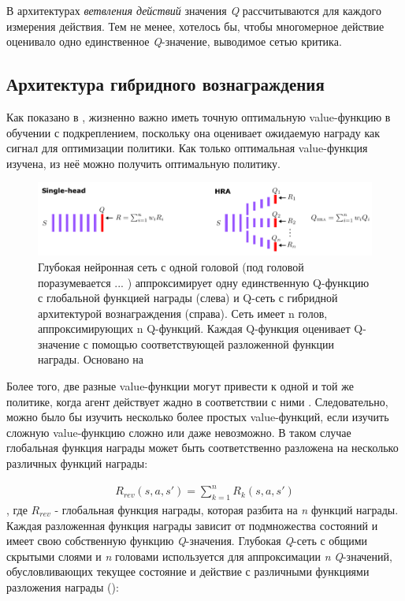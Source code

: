 В архитектурах \textit{ветвления действий} значения \textit{Q} рассчитываются для каждого измерения действия. Тем не менее, хотелось бы, чтобы многомерное действие оценивало одно единственное \textit{Q}-значение, выводимое сетью критика.

\subsection{Архитектура гибридного вознаграждения}

Как показано в \cite{seijen2017hybrid}, жизненно важно иметь точную оптимальную value-функцию в обучении с подкреплением, поскольку она оценивает ожидаемую награду как сигнал для оптимизации политики. Как только оптимальная value-функция изучена, из неё можно получить оптимальную политику.

\begin{figure}[ht!]
    \center
    \includegraphics [scale=0.80] {my_folder/images/ch2/hybrid-reward.png}
    \caption{Глубокая нейронная сеть с одной головой (под головой поразумевается ... ) аппроксимирует одну единственную Q-функцию с глобальной функцией награды (слева) и Q-сеть с гибридной архитектурой вознаграждения (справа). Сеть имеет n голов, аппроксимирующих n Q-функций. Каждая Q-функция оценивает Q-значение с помощью соответствующей разложенной функции награды. Основано на \cite{seijen2017hybrid}}
    \label{fig:ch2-hybrid-reward}
\end{figure} %

Более того, две разные value-функции могут привести к одной и той же политике, когда агент действует жадно в соответствии с ними \cite{seijen2017hybrid}. Следовательно, можно было бы изучить несколько более простых value-функций, если изучить сложную value-функцию сложно или даже невозможно. В таком случае глобальная функция награды может быть соответственно разложена на несколько различных функций награды:

\begin{equation}
    \begin{multlined}
        R_{rev}(s, a, s') = \sum^n_{k=1} R_k (s, a, s')
    \end{multlined}
\end{equation}, где $R_{rev}$ - глобальная функция награды, которая разбита на \textit{n} функций награды. Каждая разложенная функция награды зависит от подмножества состояний и имеет свою собственную функцию \textit{Q}-значения. Глубокая \textit{Q}-сеть с общими скрытыми слоями и \textit{n} головами используется для аппроксимации \textit{n} \textit{Q}-значений, обусловливающих текущее состояние и действие с различными функциями разложения награды ():

